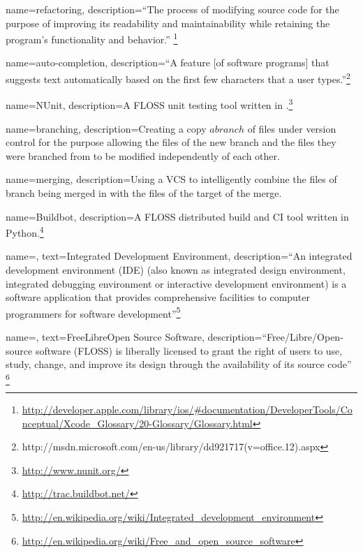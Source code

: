 
{
name=refactoring,
description={``The process of modifying source code for the purpose of improving its readability and maintainability while retaining the program's functionality and behavior.'' \footnote{\url{http://developer.apple.com/library/ios/\#documentation/DeveloperTools/Conceptual/Xcode_Glossary/20-Glossary/Glossary.html}}}
}

{
name=auto-completion,
description={``A feature {[}of software programs{]} that suggests text automatically based on the first few characters that a user types.''\footnote{http://msdn.microsoft.com/en-us/library/dd921717(v=office.12).aspx}}
}

{
name=NUnit,
description={A \gls{FLOSS} unit testing tool written in \CSharp.\footnote{\url{http://www.nunit.org/}}}
}

{
name=branching,
description={Creating a copy \(a branch\) of files under version control for the purpose allowing the files of the new branch and the files they were branched from to be modified independently of each other.
}
}

{
name=merging,
description={Using a \gls{VCS} to intelligently combine the files of branch being merged in with the files of the target of the merge.
}
}

{
name=Buildbot,
description={A \gls{FLOSS} distributed build and \gls{CI} tool written in Python.\footnote{\url{http://trac.buildbot.net/}}}
}




{
name=,
text=Integrated Development Environment,
description={``An integrated development environment (IDE) (also known as integrated design environment, integrated debugging environment or interactive development environment) is a software application that provides comprehensive facilities to computer programmers for software development''\footnote{\url{http://en.wikipedia.org/wiki/Integrated_development_environment}}}
}	


{
name=,
text=Free\/\-Libre\/\-Open Source Software,
description={``Free/\-Libre/\-Open-\-source software (FLOSS) is liberally licensed to grant the right of users to use, study, change, and improve its design through the availability of its source code'' \footnote{\url{http://en.wikipedia.org/wiki/Free_and_open_source_software}}}
}

